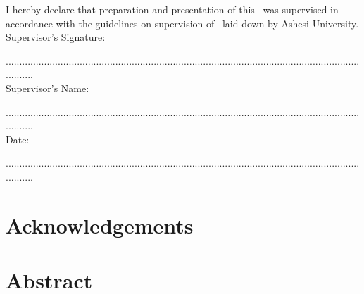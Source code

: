 \documentclass[a4paper,12pt,oneside]{report}
\begin{document}
I hereby declare that preparation and presentation of this \projecttype \ was supervised in accordance with the guidelines on supervision of \projecttype \ laid down by Ashesi University.\\

Supervisor's Signature:

...........................................................................................................................................\\

Supervisor's Name:

...........................................................................................................................................\\

Date:

...........................................................................................................................................\\

\section*{\centering Acknowledgements}
\setlength{\parindent}{0.5in}


\clearpage
{}
\section*{\centering Abstract}


\clearpage
\tableofcontents
\clearpage
\listoffigures

\clearpage
\listoftables

\printnomenclature


\newpage
{}
\label{chap:first}



\newpage
{}

\end{document}
